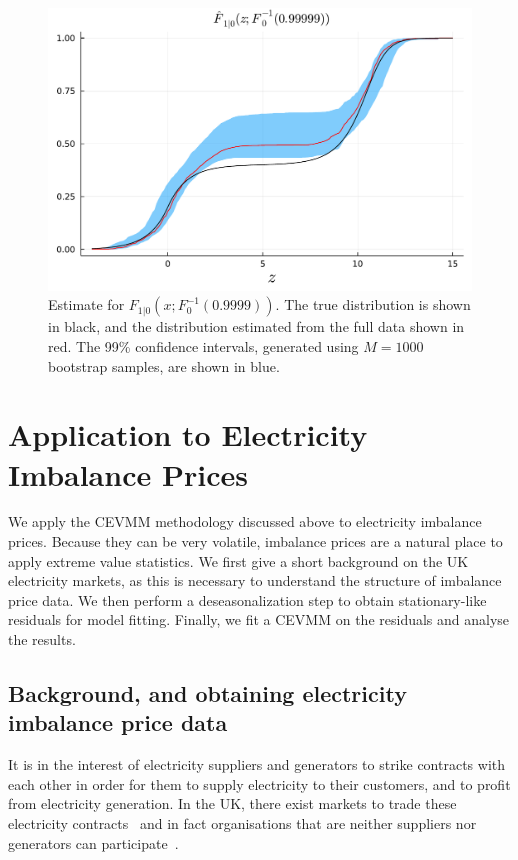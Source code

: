 \documentclass[11pt,twoside,openany]{book}
\numberwithin{Theorem}{chapter}
\numberwithin{Definition}{chapter}
\numberwithin{Lemma}{chapter}
\numberwithin{Algorithm}{chapter}
\numberwithin{equation}{chapter}
\begin{document}
\begin{figure}[htp]
  \centering
  \includegraphics[scale=0.75]{../ht-em/figures/block_bootstrap_Fs_final_bad_large2.pdf}
  \caption{Estimate for $F_{1|0}(x;F_{0}^{-1}(0.9999))$.
    The true distribution is shown in black, and the distribution estimated from the full data shown in red.
    The 99\% confidence intervals, generated using $M=1000$ bootstrap samples, are shown in blue.}
    \label{fig:block_bootstrap_Fs_final_bad_large}
\end{figure}

\FloatBarrier

\section{Application to Electricity Imbalance Prices}

We apply the CEVMM methodology discussed above to electricity imbalance prices.
Because they can be very volatile, imbalance prices are a natural place to
apply extreme value statistics. We first give a short background on the UK
electricity markets, as this is necessary to understand the structure of
imbalance price data. We then perform a deseasonalization step to obtain
stationary-like residuals for model fitting. Finally, we fit a CEVMM on the
residuals and analyse the results.


\subsection{Background, and obtaining electricity imbalance price data}


It is in the interest of electricity suppliers and generators to strike
contracts with each other in order for them to supply electricity to their
customers, and to profit from electricity generation. In the UK,
there exist markets to trade these electricity contracts~\citep{liu2022evolution}
and in fact organisations that are neither suppliers nor generators can
participate~\citep{https://www.elexon.co.uk/about/bsc-explained/}.
\end{document}
